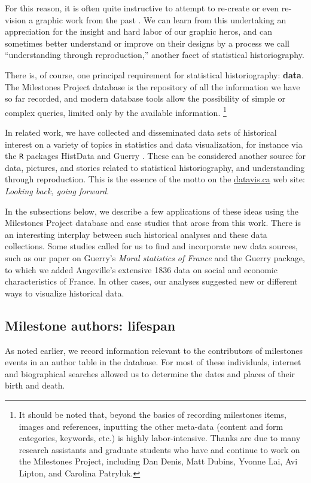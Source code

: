 For this reason, it is often quite instructive to attempt to re-create or even re-vision a graphic work from the past \citep{Friendly:02:Minard}. 
We can learn from this undertaking an appreciation for the insight and hard labor of our graphic heros, and can sometimes better understand 
or improve on their designs by a process we call ``understanding through reproduction,'' another facet of statistical historiography.



There is, of course,  one principal requirement for statistical historiography: \textbf{data}. The Milestones Project database is the repository of all the information we have so far recorded, and modern database tools allow the possibility of simple or complex queries, limited only by the available information.%
\footnote{It should be noted that, beyond the basics of recording milestones items, images and references, inputting the other meta-data (content and form categories, keywords, etc.) is highly labor-intensive. Thanks are due to many research assistants and graduate students who have and continue to work on the Milestones Project, including Dan Denis, Matt Dubins, Yvonne Lai, Avi Lipton, and Carolina Patryluk.}

In related work, we have collected and disseminated data sets of historical interest on a variety of topics in statistics and data visualization, for instance via the \texttt{R} packages HistData \citep{HistData} and Guerry \citep{Guerry}. These can be considered another source for data, pictures, and stories related to statistical historiography, and understanding through reproduction. This is the essence of the motto on the \url{datavis.ca} web site: \emph{Looking back, going forward}.

In the subsections below, we describe a few applications of these ideas using the Milestones Project database and case studies that arose from this work. There is an interesting interplay between such historical analyses and these data collections. Some studies called for us to find and incorporate new data sources, such as our paper \citep{Friendly:2007:guerry} on Guerry's \emph{Moral statistics of France} and the Guerry package, to which we added Angeville's extensive 1836 data on social and economic characteristics of France. In other cases, our analyses suggested new or different ways to visualize historical data.

\subsection{Milestone authors: lifespan}\label{sec:lifespan}
As noted earlier, we record information relevant to the contributors of milestones events in an author table in the database. For most of these individuals, internet and biographical searches allowed us to determine the dates and places of their birth and death.

